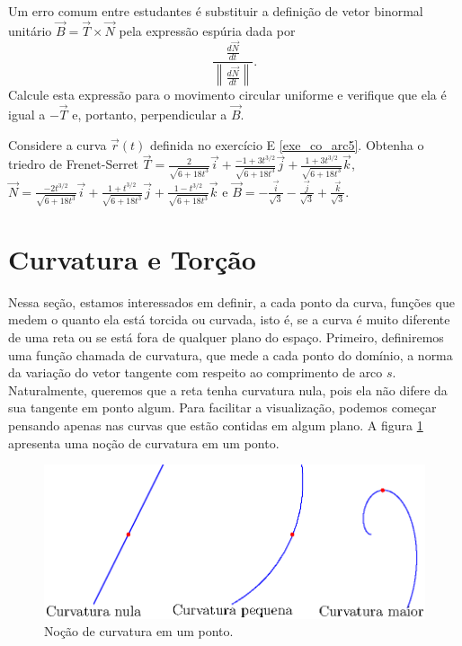 \begin{exer} Um erro comum entre estudantes é substituir a definição de vetor binormal unitário $\vec{B}=\vec{T}\times\vec{N}$ pela expressão espúria dada por $$\frac{\frac{d\vec{N}}{dt}}{\left\|\frac{d\vec{N}}{dt}\right\|}.$$ Calcule esta expressão para o movimento circular uniforme e verifique que ela é igual a $-\vec{T}$ e, portanto, perpendicular a $\vec{B}$.
\end{exer}

\begin{exer}
  Considere a curva $\vec{r}(t)$ definida no exercício E \ref{exe_co_arc5}. Obtenha o triedro de Frenet-Serret  $\vec{T}=\frac{2}{\sqrt{6+18t^3}}\vec{i}+\frac{-1+3t^{3/2}}{\sqrt{6+18t^3}}\vec{j}+\frac{1+3t^{3/2}}{\sqrt{6+18t^3}}\vec{k}$, $\vec{N} = \frac{-2t^{3/2}}{\sqrt{6+18t^3}}\vec{i}+\frac{1+t^{3/2}}{\sqrt{6+18t^3}}\vec{j}+\frac{1-t^{3/2}}{\sqrt{6+18t^3}}\vec{k}$ e $\vec{B} = -\frac{\vec{i}}{\sqrt{3}} - \frac{\vec{j}}{\sqrt{3}} + \frac{\vec{k}}{\sqrt{3}}$.
\end{exer}

\construirExer


\section{Curvatura e Torção}

Nessa seção, estamos interessados em definir, a cada ponto da curva, funções que medem o quanto ela está torcida ou curvada, isto é, se a curva é muito diferente de uma reta ou se está fora de qualquer plano do espaço. Primeiro, definiremos uma função chamada de curvatura, que mede a cada ponto do domínio, a norma da variação do vetor tangente com respeito ao comprimento de arco $s$. Naturalmente, queremos que a reta tenha curvatura nula, pois ela não difere da sua tangente em ponto algum. Para facilitar a visualização, podemos começar pensando apenas nas curvas que estão contidas em algum plano. A figura \ref{curvatura} apresenta uma noção de curvatura em um ponto.


\begin{figure}
\begin{center}
    \includegraphics{./cap_curvas/figs/exemplos_de_curvatura2}
 \caption{Noção de curvatura em um ponto.\label{curvatura}}
  \end{center}
\end{figure}


